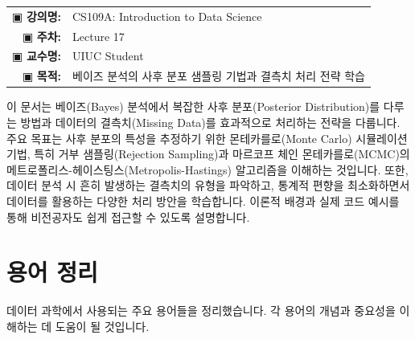 \documentclass[11pt,a4paper]{article}
\makeatletter
\theoremstyle{definition}
\newcommand{\newsection}[1]{\newpage\section{#1}}
\newcommand{\metainfo}[4]{
\begin{tcolorbox}[
    colback=lightpurple,
    colframe=darkpurple,
    boxrule=1pt,
    arc=2mm,
    left=10pt,
    right=10pt,
    top=8pt,
    bottom=8pt
]
\begin{tabular}{@{}rl@{}}
▣ \textbf{강의명:} & #1 \\[0.3em]
▣ \textbf{주차:} & #2 \\[0.3em]
▣ \textbf{교수명:} & #3 \\[0.3em]
▣ \textbf{목적:} & \begin{minipage}[t]{0.75\textwidth}#4\end{minipage}
\end{tabular}
\end{tcolorbox}
}
\makeatother
\begin{document}
\thispagestyle{firstpage}

\metainfo{CS109A: Introduction to Data Science}{Lecture 17}{UIUC Student}{베이즈 분석의 사후 분포 샘플링 기법과 결측치 처리 전략 학습}

\tableofcontents

\newpage

\begin{overviewbox}
이 문서는 베이즈(Bayes) 분석에서 복잡한 사후 분포(Posterior Distribution)를 다루는 방법과 데이터의 결측치(Missing Data)를 효과적으로 처리하는 전략을 다룹니다.
주요 목표는 사후 분포의 특성을 추정하기 위한 몬테카를로(Monte Carlo) 시뮬레이션 기법, 특히 거부 샘플링(Rejection Sampling)과 마르코프 체인 몬테카를로(MCMC)의 메트로폴리스-헤이스팅스(Metropolis-Hastings) 알고리즘을 이해하는 것입니다.
또한, 데이터 분석 시 흔히 발생하는 결측치의 유형을 파악하고, 통계적 편향을 최소화하면서 데이터를 활용하는 다양한 처리 방안을 학습합니다.
이론적 배경과 실제 코드 예시를 통해 비전공자도 쉽게 접근할 수 있도록 설명합니다.
\end{overviewbox}

\newsection{용어 정리}
데이터 과학에서 사용되는 주요 용어들을 정리했습니다. 각 용어의 개념과 중요성을 이해하는 데 도움이 될 것입니다.
\end{document}
